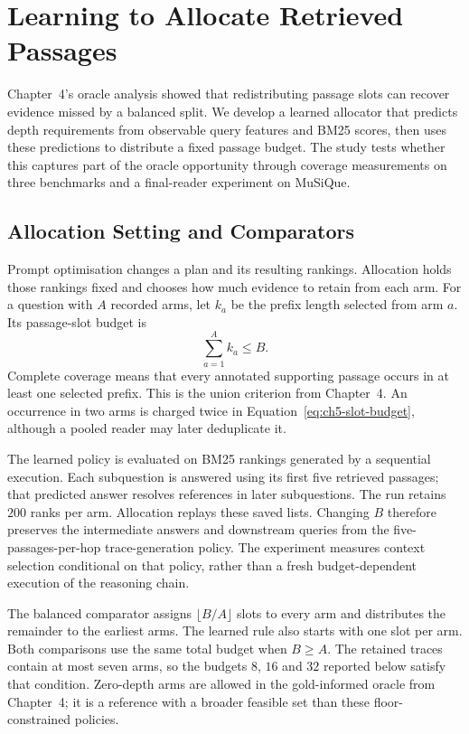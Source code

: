 \section{Learning to Allocate Retrieved Passages}
\label{sec:ch5-allocation}

Chapter~4's oracle analysis showed that redistributing passage slots can
recover evidence missed by a balanced split. We develop a learned allocator
that predicts depth requirements from observable query features and BM25
scores, then uses these predictions to distribute a fixed passage budget.
The study tests whether this captures part of the oracle opportunity through
coverage measurements on three benchmarks and a final-reader experiment on
MuSiQue.

\subsection{Allocation Setting and Comparators}

Prompt optimisation changes a plan and its resulting rankings. Allocation
holds those rankings fixed and chooses how much evidence to retain from each
arm. For a question with $A$ recorded arms, let $k_a$ be the prefix length
selected from arm $a$. Its passage-slot budget is
\begin{equation}
  \sum_{a=1}^{A}k_a\leq B.
  \label{eq:ch5-slot-budget}
\end{equation}
Complete coverage means that every annotated supporting passage occurs in
at least one selected prefix. This is the union criterion from Chapter~4.
An occurrence in two arms is charged twice in Equation~\ref{eq:ch5-slot-budget},
although a pooled reader may later deduplicate it.

The learned policy is evaluated on BM25 rankings generated by a sequential
execution. Each subquestion is answered using its first five retrieved
passages; that predicted answer resolves references in later subquestions.
The run retains $200$ ranks per arm. Allocation replays these saved lists.
Changing $B$ therefore preserves the intermediate answers and downstream
queries from the five-passages-per-hop trace-generation policy. The experiment
measures context selection conditional on that policy, rather than a fresh
budget-dependent execution of the reasoning chain.

The balanced comparator assigns $\lfloor B/A\rfloor$ slots to every arm and
distributes the remainder to the earliest arms. The learned rule also starts
with one slot per arm. Both comparisons use the same total budget when
$B\geq A$. The retained traces contain at most seven arms, so the budgets
$8$, $16$ and $32$ reported below satisfy that condition. Zero-depth arms
are allowed in the gold-informed oracle from Chapter~4; it is a reference
with a broader feasible set than these floor-constrained policies.

